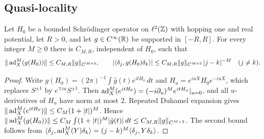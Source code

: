 \subsection{Quasi-locality}

\begin{lemma}\label{lem:QL}
Let $H_0$ be a bounded Schr\"odinger operator on $\ell^2(\mathbb Z)$ with hopping one and real potential, let $R>0$, and let $g\in C^\infty(\mathbb R)$ be supported in $[-R,R]$. For every integer $M\ge0$ there is $C_{M,R}$, independent of $H_0$, such that
\[
\|\operatorname{ad}_X^M(g(H_0))\|\le C_{M,R}\|g\|_{C^{M+2}},\qquad |\langle\delta_j,g(H_0)\delta_k\rangle|\le C_{M,R}\|g\|_{C^{M+2}}\,|j-k|^{-M}\quad(j\ne k).
\]
\end{lemma}

\begin{proof}
Write $g(H_0)=(2\pi)^{-1}\int\hat g(t)e^{itH_0}\,dt$ and $H_u=e^{iuX}H_0e^{-iuX}$, which replaces $S^{\pm1}$ by $e^{\mp iu}S^{\pm1}$. Then $\operatorname{ad}_X^M(e^{itH_0})=(-i\partial_u)^Me^{itH_u}|_{u=0}$, and all $u$-derivatives of $H_u$ have norm at most $2$. Repeated Duhamel expansion gives $\|\operatorname{ad}_X^M(e^{itH_0})\|\le C_M(1+|t|)^M$. Hence $\|\operatorname{ad}^M_X(g(H_0))\|\le C_M\int(1+|t|)^M|\hat g(t)|\,dt\le C_{M,R}\|g\|_{C^{M+2}}$. The second bound follows from $\langle\delta_j,\operatorname{ad}_X^M(Y)\delta_k\rangle=(j-k)^M\langle\delta_j,Y\delta_k\rangle$.
\end{proof}
